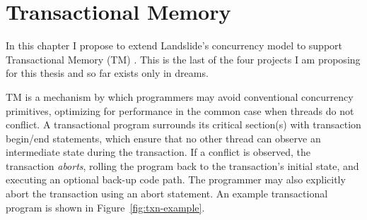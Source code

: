 \chapter{Transactional Memory}
\label{chap:tm}

In this chapter I propose to extend Landslide's concurrency model to support Transactional Memory (TM) \cite{transactional-memory}.
This is the last of the four projects I am proposing for this thesis and so far exists only in dreams.

TM is a mechanism by which programmers may avoid conventional concurrency primitives, optimizing for performance in the common case when threads do not conflict.
A transactional program surrounds its critical section(s) with transaction begin/end statements, which ensure that no other thread can observe an intermediate state during the transaction.
If a conflict is observed, the transaction {\em aborts}, rolling the program back to the transaction's initial state, and executing an optional back-up code path.
The programmer may also explicitly abort the transaction using an abort statement.
An example transactional program is shown in Figure~\ref{fig:txn-example}.

